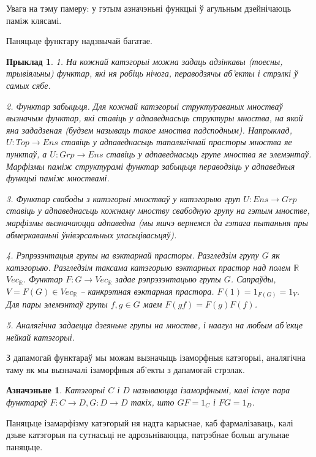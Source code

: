 \documentclass[a4paper,12pt]{book}
\newtheorem{example}{Прыклад}[section]
\newtheorem{definition}{Азначэньне}[section]
\begin{document}
Увага на тэму памеру: у гэтым азначэньні функцыі ў агульным
дзейнічаюць паміж клясамі.

Паняцьце функтару надзвычай багатае.

\begin{example}
  1. На кожнай катэгорыі можна задаць адзінкавы (тоесны, трывіяльны) функтар, які ня робіць
  нічога, пераводзячы аб'екты і стрэлкі ў самых сябе.

  2. Функтар забыцьця. Для кожнай катэгорыі структураваных мностваў
  вызначым функтар, які ставіць у адпаведнасьць структуры мноства, на
  якой яна зададзеная (будзем называць такое мноства
  падсподным). Напрыклад, $U: Top \rightarrow Ens$ ставіць у
  адпаведнасьць тапалягічнай прасторы мноства яе пунктаў, а $U: Grp
  \rightarrow Ens$ ставіць у адпаведнасьць групе мноства яе
  элемэнтаў. Марфізмы паміж структурамі функтар забыцьця пераводзіць у
  адпаведныя функцыі паміж мноствамі.

  3. Функтар свабоды з катэгорыі мностваў у катэгорыю груп $U: Ens
  \rightarrow Grp$ ставіць у адпаведнасьць кожнаму мноству свабодную
  групу на гэтым мностве, марфізмы вызначаюцца адпаведна (мы яшчэ
  вернемся да гэтага пытаньня пры абмеркаваньні ўнівэрсальных
  уласьцівасьцяў).

  4. Рэпрэзэнтацыя групы на вэктарнай прасторы. Разгледзім групу $G$
  як катэгорыю. Разгледзім таксама катэгорыю вэктарных прастор над
  полем $\mathbb{R}$ $Vec_{\mathbb{R}}$. Функтар $F: G \rightarrow
  Vec_{\mathbb{R}}$ задае рэпрэзэнтацыю групы $G$. Сапраўды, $V = F(G) \in
  Vec_{\mathbb{R}}$ -- канкрэтная вэктарная прастора. $F(1) = 1_{F(G)}
  = 1_V$. Для пары элемэнтаў групы $f, g \in G$ маем $F(gf) =
  F(g)F(f)$.

  5. Аналягічна задаецца дзеяньне групы на мностве, і наагул на любым
  аб'екце нейкай катэгорыі.
\end{example}

З дапамогай функтараў мы можам вызначыць ізаморфныя катэгорыі,
аналягічна таму як мы вызначалі ізаморфныя аб'екты з дапамогай стрэлак.

\begin{definition}
  Катэгорыі $C$ і $D$ называюцца ізаморфнымі, калі існуе пара
  функтараў $F: C \rightarrow D, G: D \rightarrow D$ такіх, што $GF =
  1_C$ і $FG = 1_D$.
\end{definition}

Паняцьце ізамарфізму катэгорый ня надта карыснае, каб фармалізаваць,
калі дзьве катэгорыя па сутнасьці не адрозьніваюцца, патрэбнае больш
агульнае паняцьце.
\end{document}
